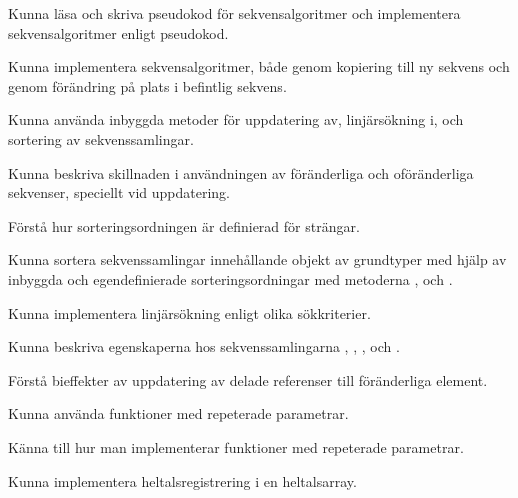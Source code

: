 
\item Kunna läsa och skriva pseudokod för sekvensalgoritmer och implementera sekvensalgoritmer enligt pseudokod.

\item Kunna implementera sekvensalgoritmer, både genom kopiering till ny sekvens och genom förändring på plats i befintlig sekvens.

\item Kunna använda inbyggda metoder för uppdatering av, linjärsökning i, och sortering av sekvenssamlingar.

\item Kunna beskriva skillnaden i användningen av föränderliga och oföränderliga sekvenser, speciellt vid uppdatering.

\item Förstå hur sorteringsordningen är definierad för strängar.

\item Kunna sortera sekvenssamlingar innehållande objekt av grundtyper med hjälp av inbyggda och egendefinierade sorteringsordningar med metoderna ,  och .

\item Kunna implementera linjärsökning enligt olika sökkriterier.


\item Kunna beskriva egenskaperna hos sekvenssamlingarna , , ,  och .

\item Förstå bieffekter av uppdatering av delade referenser till föränderliga element.

\item Kunna använda funktioner med repeterade parametrar.

\item Känna till hur man implementerar funktioner med repeterade parametrar.

\item Kunna implementera heltalsregistrering i en heltalsarray.




